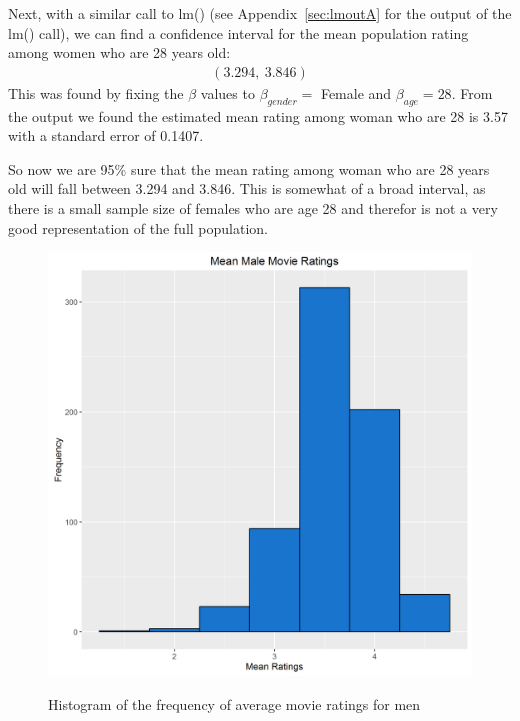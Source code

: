 \documentclass[11pt]{article}  %
\begin{document}
\begin{enumerate}
    Next, with a similar call to lm() (see Appendix~\ref{sec:lmoutA} for the output of the lm() call), we can find a confidence interval for the mean population rating among women who are 28 years old:
    \begin{align*}
        (3.294,\ 3.846)
    \end{align*}
    This was found by fixing the $\beta$ values to $\beta_{gender} =$ Female and $\beta_{age} = 28$. From the output we found the estimated mean rating among woman who are 28 is 3.57 with a standard error of 0.1407.

    So now we are 95\% sure that the mean rating among woman who are 28 years old will fall between 3.294 and 3.846. This is somewhat of a broad interval, as there is a small sample size of females who are age 28 and therefor is not a very good representation of the full population.

    \begin{figure}[h]
    \centering
    \caption{Histogram of the frequency of average movie ratings for men}
    \includegraphics[scale=.50]{MaleHistogram}
    \label{fig:menhist}
    \end{figure}
    

\end{enumerate}
\end{document}
